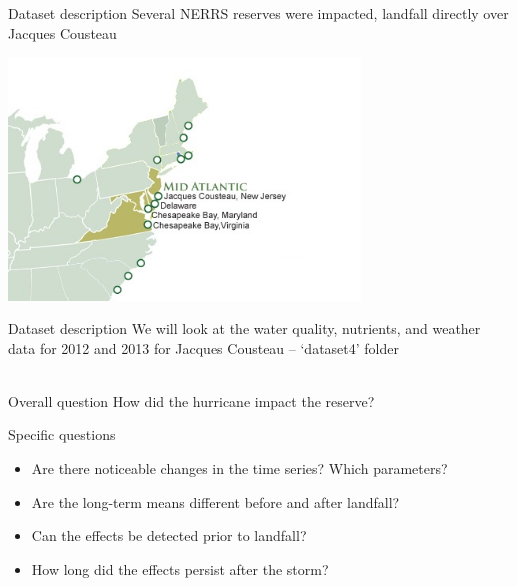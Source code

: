 \documentclass[xcolor=svgnames]{beamer}\usepackage[]{graphicx}\usepackage[]{color}
\begin{document}
\begin{frame}{Dataset description}
Several NERRS reserves were impacted, landfall directly over Jacques Cousteau
\centerline{\includegraphics[width = 0.7\textwidth]{mid_atlantic.jpg}}
\end{frame}

\begin{frame}{Dataset description}
We will look at the water quality, nutrients, and weather data for 2012 and 2013 for Jacques Cousteau -- `dataset4' folder \\~\\
\begin{block}{Overall question}
How did the hurricane impact the reserve?
\end{block}
\vspace{0.1in}
Specific questions
\begin{itemize}
\item Are there noticeable changes in the time series? Which parameters?
\item Are the long-term means different before and after landfall?
\item Can the effects be detected prior to landfall?
\item How long did the effects persist after the storm?
\end{itemize}
\end{frame}
\end{document}
